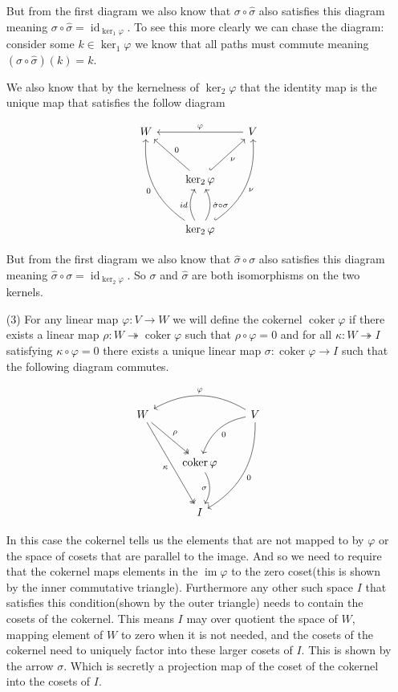 \documentclass[12pt]{amsart}
\theoremstyle{definition}
\DeclareMathOperator{\kernel}{\mathrm{ker}}
\DeclareMathOperator{\coker}{\mathrm{coker}}
\DeclareMathOperator{\image}{\mathrm{im}}
\DeclareMathOperator{\id}{\mathrm{id}}
\newcommand{\ra}{\rightarrow}
\begin{document}
\begin{itemize}
 But from the first diagram we also know that $\sigma\circ\hat\sigma$ also satisfies this diagram meaning $\sigma\circ\hat\sigma=\id_{\kernel_1\varphi}$. To see this more clearly we can chase the diagram: consider some $k\in \kernel_1\varphi$ we know that all paths must commute meaning $(\sigma\circ\hat\sigma)(k)=k$. 
 
 We also know that by the kernelness of $\kernel_2\varphi$ that the identity map is the unique map that satisfies the follow diagram

\[
\begin{tikzcd}[row sep=1cm, column sep=.75cm]
W\arrow[leftarrow, rr, "\varphi"] & & V\\
& \kernel_2\varphi \arrow[ul, "0"']\arrow[ur, hook, "\nu"']\\
& \kernel_2\varphi \arrow[uul, bend left, "0"]\arrow[u,"\hat\sigma\circ\sigma"', bend right]\arrow[u,"id", bend left]\arrow[uur, bend right, hook, "\nu"']
\end{tikzcd}
\]

 But from the first diagram we also know that $\hat\sigma\circ\sigma$ also satisfies this diagram meaning $\hat\sigma\circ\sigma=\id_{\kernel_2\varphi}$. So $\sigma$ and $\hat\sigma$ are both isomorphisms on the two kernels.\\%

\item[(3)] For any linear map $\varphi:V\ra W$ we will define the cokernel $\coker\varphi$ if there exists a linear map $\rho: W\twoheadrightarrow \coker\varphi$ such that $\rho\circ \varphi=0$ and for all $\kappa:W\twoheadrightarrow I$ satisfying $\kappa\circ \varphi=0$ there exists a unique linear map $\sigma:\coker\varphi\ra I$ such that the following diagram commutes.


\[
\begin{tikzcd}[row sep=1cm, column sep=.75cm]
W\arrow[leftarrow, rr, bend left, "\varphi"] & & V\\
& \coker\varphi \arrow[d, bend left, "\sigma"']\arrow[twoheadleftarrow, ul, "\rho"']\arrow[leftarrow, ur, bend left, "0"']\\
& I \arrow[twoheadleftarrow,uul, "\kappa"]\arrow[leftarrow, uur, bend right, "0"']
\end{tikzcd}
\]

In this case the cokernel tells us the elements that are not mapped to by $\varphi$ or the space of cosets that are parallel to the image. And so we need to require that the cokernel maps elements in the $\image\varphi$ to the zero coset(this is shown by the inner commutative triangle). Furthermore any other such space $I$ that satisfies this condition(shown by the outer triangle) needs to contain the cosets of the cokernel. This means $I$ may over quotient the space of $W$, mapping element of $W$ to zero when it is not needed, and the cosets of the cokernel need to uniquely factor into these larger cosets of $I$. This is shown by the arrow $\sigma$. Which is secretly a projection map of the coset of the cokernel into the cosets of $I$.\\


\end{itemize}
\end{document}
